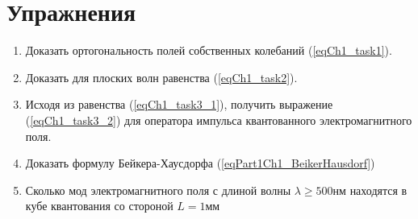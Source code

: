 \section{Упражнения}
\begin{enumerate}
\item Доказать ортогональность полей собственных колебаний
  (\ref{eqCh1_task1}).  
\item Доказать для плоских волн равенства (\ref{eqCh1_task2}).
\item Исходя из равенства (\ref{eqCh1_task3_1}), получить выражение
  (\ref{eqCh1_task3_2}) для оператора импульса квантованного
  электромагнитного поля. 
\item Доказать формулу Бейкера-Хаусдорфа (\ref{eqPart1Ch1_BeikerHausdorf})
\item Сколько мод электромагнитного поля с длиной волны
  $\lambda \ge 500 \mbox{нм}$ находятся в кубе квантования со стороной
  $L=1 \mbox{мм}$ \cite{courseIntroQuantumOpticsCoursera}
\end{enumerate}
